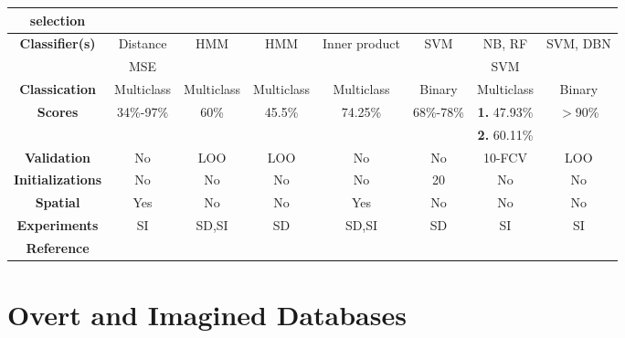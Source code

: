\begin{landscape}
\begin{table}[h!]
{\begin{tabular}{|*{8}{c|}}
		\textbf{selection}  &       &       &       &       &       &       & \\\hline
		\multicolumn{1}{|c|}{\multirow{2}{*}{\textbf{Classifier(s)}}} & Distance & HMM   & HMM   & Inner product & SVM   & NB, RF & SVM, DBN \\
		&   MSE    &       &       &  &       & SVM   &  \\\hline
		\textbf{Classication} & Multiclass & Multiclass & Multiclass & Multiclass & Binary & Multiclass & Binary \\\hline
		\multicolumn{1}{|c|}{\multirow{2}{*}{\textbf{Scores}}} & 34\%-97\% & 60\% & 45.5\% & 74.25\% & 68\%-78\% & \textbf{1.} 47.93\% & $>$90\% \\
		&       &       &       &  &       &  \textbf{2.} 60.11\%  &  \\\hline
		\textbf{Validation} & No    & LOO   & LOO   & No    & No    & 10-FCV & LOO \\\hline
		\textbf{Initializations} & No    & No    & No    & No    & 20 & No    & No \\\hline
		\textbf{Spatial} & Yes   & No    & No    & Yes   & No    & No    & No \\\hline
		\textbf{Experiments} & SI    & SD,SI & SD    & SD,SI & SD    & SI    & SI \\\hline
		\textbf{Reference} & \cite{suppes1997brain} & \cite{marek} & \cite{porbadnigk2009eeg} & \cite{d2009toward} & \cite{dasalla2009spatial} & \cite{torres2013analisis} & \cite{zhao2015classifying} \\\hline
	\end{tabular}%
	}
	\label{Table: Comparatives_Imagined}%
\end{table}%
\end{landscape}

\section{Overt and Imagined Databases}

